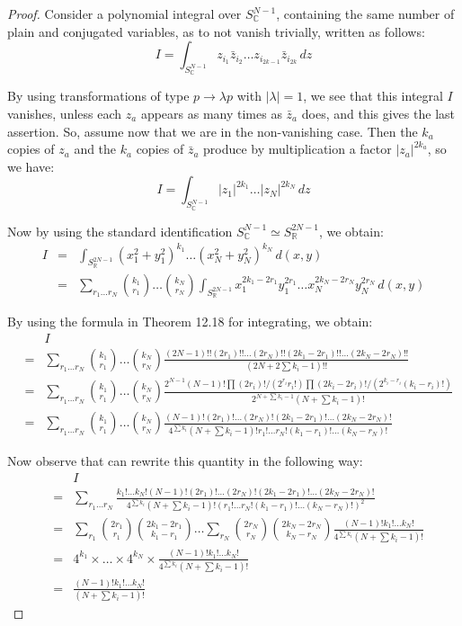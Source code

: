 \documentclass[12pt]{amsbook}
\begin{document}
\begin{proof}
Consider a polynomial integral over $S^{N-1}_\mathbb C$, containing the same number of plain and conjugated variables, as to not vanish trivially, written as follows:
$$I=\int_{S^{N-1}_\mathbb C}z_{i_1}\bar{z}_{i_2}\ldots z_{i_{2k-1}}\bar{z}_{i_{2k}}\,dz$$

By using transformations of type $p\to\lambda p$ with $|\lambda|=1$, we see that this integral $I$ vanishes, unless each $z_a$ appears as many times as $\bar{z}_a$ does, and this gives the last assertion. So, assume now that we are in the non-vanishing case. Then the $k_a$ copies of $z_a$ and the $k_a$ copies of $\bar{z}_a$ produce by multiplication a factor $|z_a|^{2k_a}$, so we have:
$$I=\int_{S^{N-1}_\mathbb C}|z_1|^{2k_1}\ldots|z_N|^{2k_N}\,dz$$

Now by using the standard identification $S^{N-1}_\mathbb C\simeq S^{2N-1}_\mathbb R$, we obtain:
\begin{eqnarray*}
I
&=&\int_{S^{2N-1}_\mathbb R}(x_1^2+y_1^2)^{k_1}\ldots(x_N^2+y_N^2)^{k_N}\,d(x,y)\\
&=&\sum_{r_1\ldots r_N}\binom{k_1}{r_1}\ldots\binom{k_N}{r_N}\int_{S^{2N-1}_\mathbb R}x_1^{2k_1-2r_1}y_1^{2r_1}\ldots x_N^{2k_N-2r_N}y_N^{2r_N}\,d(x,y)
\end{eqnarray*}

By using the formula in Theorem 12.18 for integrating, we obtain:
\begin{eqnarray*}
&&I\\
&=&\sum_{r_1\ldots r_N}\binom{k_1}{r_1}\ldots\binom{k_N}{r_N}\frac{(2N-1)!!(2r_1)!!\ldots(2r_N)!!(2k_1-2r_1)!!\ldots (2k_N-2r_N)!!}{(2N+2\sum k_i-1)!!}\\
&=&\sum_{r_1\ldots r_N}\binom{k_1}{r_1}\ldots\binom{k_N}{r_N}\frac{2^{N-1}(N-1)!\prod(2r_i)!/(2^{r_i}r_i!)\prod(2k_i-2r_i)!/(2^{k_i-r_i}(k_i-r_i)!)}{2^{N+\sum k_i-1}(N+\sum k_i-1)!}\\
&=&\sum_{r_1\ldots r_N}\binom{k_1}{r_1}\ldots\binom{k_N}{r_N}
\frac{(N-1)!(2r_1)!\ldots (2r_N)!(2k_1-2r_1)!\ldots (2k_N-2r_N)!}{4^{\sum k_i}(N+\sum k_i-1)!r_1!\ldots r_N!(k_1-r_1)!\ldots (k_N-r_N)!}
\end{eqnarray*}

Now observe that can rewrite this quantity in the following way:
\begin{eqnarray*}
&&I\\
&=&\sum_{r_1\ldots r_N}\frac{k_1!\ldots k_N!(N-1)!(2r_1)!\ldots (2r_N)!(2k_1-2r_1)!\ldots (2k_N-2r_N)!}{4^{\sum k_i}(N+\sum k_i-1)!(r_1!\ldots r_N!(k_1-r_1)!\ldots (k_N-r_N)!)^2}\\
&=&\sum_{r_1}\binom{2r_1}{r_1}\binom{2k_1-2r_1}{k_1-r_1}\ldots\sum_{r_N}\binom{2r_N}{r_N}\binom{2k_N-2r_N}{k_N-r_N}\frac{(N-1)!k_1!\ldots k_N!}{4^{\sum k_i}(N+\sum k_i-1)!}\\
&=&4^{k_1}\times\ldots\times 4^{k_N}\times\frac{(N-1)!k_1!\ldots k_N!}{4^{\sum k_i}(N+\sum k_i-1)!}\\
&=&\frac{(N-1)!k_1!\ldots k_N!}{(N+\sum k_i-1)!}
\end{eqnarray*}


\end{proof}
\end{document}
